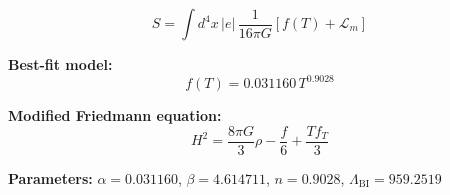 
\begin{equation}
  S = \int d^4x \, |e| \, \frac{1}{16\pi G} \left[ f(T) + \mathcal{L}_m \right]
\end{equation}

\textbf{Best-fit model:}
\begin{equation}
  f(T) = 0.031160 \, T^{0.9028}
\end{equation}

\textbf{Modified Friedmann equation:}
\begin{equation}
  H^2 = \frac{8\pi G}{3} \rho - \frac{f}{6} + \frac{T f_T}{3}
\end{equation}

\textbf{Parameters:}
$\alpha = 0.031160$, \quad
$\beta = 4.614711$, \quad
$n = 0.9028$, \quad
$\Lambda_{\text{BI}} = 959.2519$